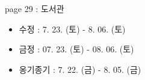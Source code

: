 \documentclass[aspectratio=1610,17pt,xcolor=pdftex,dvipsnames,table,handout]{beamer}
\begin{document}
%
%
%								


%
%
%								


		\begin{frame} [t,plain]

			\begin{block} { page 29 : 도서관 }
			\setlength{\leftmargini}{3em}			

			\begin{itemize}
			\item 	수정 : 7. 23. (토) - 8. 06. (토)
			\item 	금정 : 07. 23. (토) - 08. 06. (토)
			\item 	옹기종기 : 7. 22. (금) - 8. 05. (금)
			\end{itemize}

			\end{block}			


		\end{frame}	 %
\end{document}
